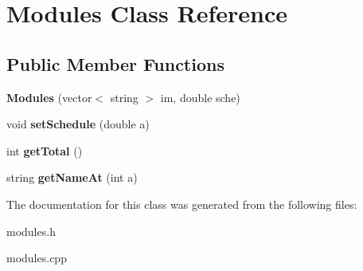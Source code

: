 \hypertarget{class_modules}{}\section{Modules Class Reference}
\label{class_modules}
\subsection*{Public Member Functions}
\begin{DoxyCompactItemize}
\item 
{\bfseries Modules} (vector$<$ string $>$ im, double sche)\hypertarget{class_modules_a49cce610e2677d860dda8999ed68878b}{}\label{class_modules_a49cce610e2677d860dda8999ed68878b}

\item 
void {\bfseries set\+Schedule} (double a)\hypertarget{class_modules_ace696d74c2965feceede8db124cb1bfd}{}\label{class_modules_ace696d74c2965feceede8db124cb1bfd}

\item 
int {\bfseries get\+Total} ()\hypertarget{class_modules_a69650dfe73d4ee87df5286d861ecb323}{}\label{class_modules_a69650dfe73d4ee87df5286d861ecb323}

\item 
string {\bfseries get\+Name\+At} (int a)\hypertarget{class_modules_a9d31e4d161435e558a6f47014846f62e}{}\label{class_modules_a9d31e4d161435e558a6f47014846f62e}

\end{DoxyCompactItemize}


The documentation for this class was generated from the following files\+:\begin{DoxyCompactItemize}
\item 
modules.\+h\item 
modules.\+cpp\end{DoxyCompactItemize}
